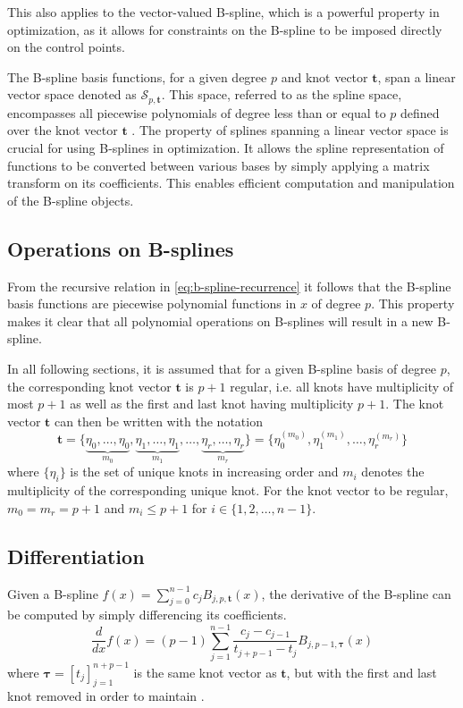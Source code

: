 This also applies to the vector-valued B-spline, which is a powerful property in optimization, as it allows for constraints on the B-spline to be imposed directly on the control points.

The B-spline basis functions, for a given degree \(p\) and knot vector \(\mathbf{t}\), span a linear vector space denoted as \(\mathcal{S}_{p, \mathbf{t}}\). This space, referred to as the spline space, encompasses all piecewise polynomials of degree less than or equal to \(p\) defined over the knot vector \(\mathbf{t}\) \citep{Grimstad2016}. The property of splines spanning a linear vector space is crucial for using B-splines in optimization. 
It allows the spline representation of functions to be converted between various bases by simply applying a matrix transform on its coefficients. This enables efficient computation and manipulation of the B-spline objects.

\subsection{Operations on B-splines}
From the recursive relation in \cref{eq:b-spline-recurrence} it follows that the B-spline basis functions are piecewise polynomial functions in $x$ of degree $p$. This property makes it clear that all polynomial operations on B-splines will result in a new B-spline.

In all following sections, it is assumed that for a given B-spline basis of degree $p$, the corresponding knot vector $\mathbf t$ is $p+1$ regular, i.e. all knots have multiplicity of most $p+1$ as well as the first and last knot having multiplicity $p+1$. The knot vector $\mathbf t$ can then be written with the notation 
\begin{equation}\label{eq:regular-knot-vector}
    \mathbf t = \{\underbrace{\eta_0, \dots, \eta_0}_{m_0}, \underbrace{\eta_1, \dots, \eta_1}_{m_1}, \dots, \underbrace{\eta_{r}, \dots, \eta_{r}}_{m_r}\} = \{\eta_0^{(m_0)}, \eta_1^{(m_1)}, \dots, \eta_r^{(m_r)}\}
\end{equation}
where $\{\eta_i\}$ is the set of unique knots in increasing order and $m_i$ denotes the multiplicity of the corresponding unique knot. For the knot vector to be regular, $m_0 = m_r = p+1$ and $m_i \leq p+1$ for $i \in \{1,2,\ldots,n-1\}$.

\subsection{Differentiation}\label{sec:derivative}
Given a B-spline $f(x) = \sum_{j=0}^{n-1} c_j B_{j, p, \mathbf{t}}(x)$,
the derivative of the B-spline can be computed by simply differencing its coefficients. 
\begin{equation}\label{eq:b-spline-derivative}
    \frac{d}{dx} f(x) = (p-1) \sum_{j=1}^{n-1} \frac{c_j-c_{j-1}}{t_{j+p-1}-t_j} B_{j, p-1, \boldsymbol{\tau}}(x)
\end{equation}
where $\boldsymbol{\tau} = [t_j]_{j=1}^{n+p-1}$ is the same knot vector as $\mathbf{t}$, but with the first and last knot removed in order to maintain .

